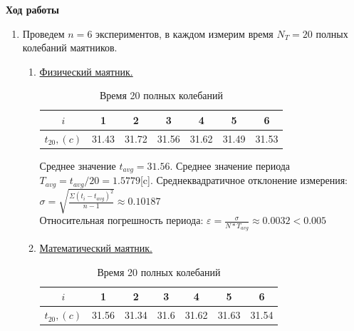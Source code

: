 \documentclass[12pt]{article}
\begin{document}
    \textbf{Ход работы}
    \begin{enumerate} 
        \item Проведем $n = 6$ экспериментов, в каждом измерим время $N_T = 20$ полных колебаний маятников.
        \begin{enumerate}
            \item \underline{Физический маятник.}
            \begin{table}[h]
                    \caption{Время 20 полных колебаний}
                    \begin{center}
                    \begin{tabular}{|c|c|c|c|c|c|c|}
                            \hline 
                                $i$ & 1 & 2 & 3 & 4 & 5 & 6 \\
                            \hline
                                $t_{20} , (c)$ &31.43&31.72&31.56&31.62&31.49&31.53\\
                            \hline
                            \end{tabular}
                        \end{center}
            \end{table}

            Среднее значение $t_{avg} = 31.56$. Среднее значение периода $T_{avg} = t_{avg}/20 = 1.5779$[c].
            Среднеквадратичное отклонение измерения:
            $\sigma = \sqrt{\frac{\Sigma (t_i - t_{avg})^2 }{n-1}} \approx 0.10187$ \\
            Относительная погрешность периода: $\varepsilon = \frac{\sigma}{N* T_{avg}} \approx 0.0032 < 0.005$ \\  
        \item \underline{Математический маятник.}
            \begin{table}[h]
                    \caption{Время 20 полных колебаний}
                    \begin{center}
                    \begin{tabular}{|c|c|c|c|c|c|c|}
                            \hline 
                                $i$ & 1 & 2 & 3 & 4 & 5 & 6 \\
                            \hline
                                $t_{20} , (c)$ &31.56&31.34&31.6&31.62&31.63&31.54\\
                            \hline
                            \end{tabular}
                        \end{center}
            \end{table}


\end{enumerate}
\end{enumerate}
\end{document}
